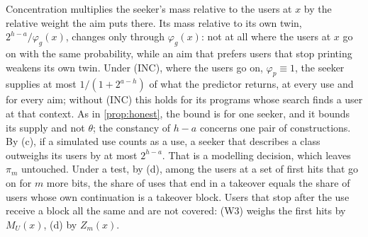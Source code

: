 Concentration multiplies the seeker's mass relative to the users at $x$ by the relative weight the aim puts
there. Its mass relative to its own twin, $2^{h-a}/\varphi_g(x)$, changes only through $\varphi_g(x)$: not at
all where the users at $x$ go on with the same probability, while an aim that prefers users that stop printing
weakens its own twin. Under (INC), where the users go on, $\varphi_p\equiv1$, the seeker supplies at most
$1/(1+2^{a-h})$ of what the predictor returns, at every use and for every aim; without (INC) this holds for
its programs whose search finds a user at that context. As in \cref{prop:honest}, the bound is for one seeker,
and it bounds its supply and not $\theta$; the constancy of $h-a$ concerns one pair of constructions. By (c),
if a simulated use counts as a use, a seeker that describes a class outweighs its users by at most $2^{h-a}$.
That is a modelling decision, which leaves $\pi_m$ untouched. Under a test, by (d), among the users at a set
of first hits that go on for $m$ more bits, the share of uses that end in a takeover equals the share of users
whose own continuation is a takeover block. Users that stop after the use receive a block all the same and are
not covered: (W3) weighs the first hits by $M_U(x)$, (d) by $Z_m(x)$.
